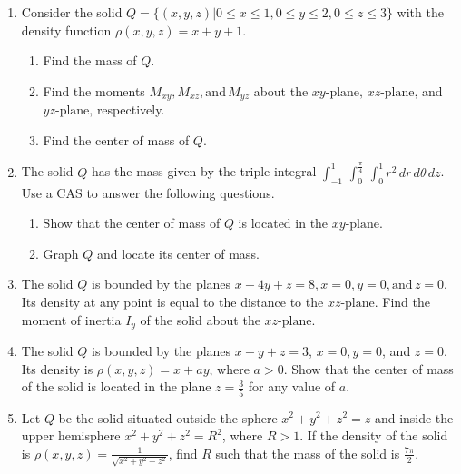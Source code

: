 \documentclass{exercises}
\begin{document}
\begin{enumerate}[resume]
\begin{enumerate}[label=(\alph*)]
  \item Find the mass of $Q$.
  \item Find the moments $M_{xy},M_{xz},\text{and}\,M_{yz}$ about the $xy\text{-plane,}$ $xz\text{-plane,}$ and $yz\text{-plane,}$ respectively.
  \item Find the center of mass of $Q$.
  \item Graph $Q$ and locate its center of mass.
\end{enumerate}
\item Consider the solid $Q=\{(x,y,z)|0\le x\le1,0\le y\le2,0\le z\le3\}$ with the density function $\rho(x,y,z)=x+y+1$.
\begin{enumerate}[label=(\alph*)]
  \item Find the mass of $Q$.
  \item Find the moments $M_{xy},M_{xz},\text{and}\,M_{yz}$ about the $xy\text{-plane,}$ $xz\text{-plane,}$ and $yz\text{-plane,}$ respectively.
  \item Find the center of mass of $Q$.
\end{enumerate}
\item \techrequired The solid $Q$ has the mass given by the triple integral $\int_{-1}^{1}\,\int_{0}^{\frac{\pi}{4}}\,\int_{0}^{1}r^{2}\,dr\,d\theta \,dz$. Use a CAS to answer the following questions.
\begin{enumerate}[label=(\alph*)]
  \item Show that the center of mass of $Q$ is located in the $xy\text{-plane.}$
  \item Graph $Q$ and locate its center of mass.
\end{enumerate}
\item The solid $Q$ is bounded by the planes $x+4y+z=8,x=0,y=0,\text{and}\,z=0$. Its density at any point is equal to the distance to the $xz\text{-plane}$. Find the moment of inertia $I_{y}$ of the solid about the $xz\text{-plane}$.
\item The solid $Q$ is bounded by the planes $x+y+z=3$, $x=0,y=0$, and $z=0$. Its density is $\rho(x,y,z)=x+ay$, where $a>0$. Show that the center of mass of the solid is located in the plane $z=\frac{3}{5}$ for any value of $a$.
\item Let $Q$ be the solid situated outside the sphere $x^{2}+y^{2}+z^{2}=z$ and inside the upper hemisphere $x^{2}+y^{2}+z^{2}=R^{2}$, where $R>1$. If the density of the solid is $\rho(x,y,z)=\frac{1}{\sqrt{x^{2}+y^{2}+z^{2}}}$, find $R$ such that the mass of the solid is $\frac{7\pi}{2}$.

\end{enumerate}
\end{document}

